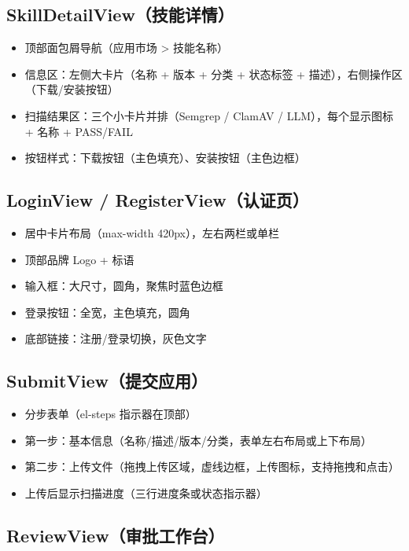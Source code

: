 \documentclass[11pt,a4paper]{article}
\begin{document}
\subsection{SkillDetailView（技能详情）}

\begin{itemize}[nosep]
  \item 顶部面包屑导航（应用市场 > 技能名称）
  \item 信息区：左侧大卡片（名称 + 版本 + 分类 + 状态标签 + 描述），右侧操作区（下载/安装按钮）
  \item 扫描结果区：三个小卡片并排（Semgrep / ClamAV / LLM），每个显示图标 + 名称 + PASS/FAIL
  \item 按钮样式：下载按钮（主色填充）、安装按钮（主色边框）
\end{itemize}

\subsection{LoginView / RegisterView（认证页）}

\begin{itemize}[nosep]
  \item 居中卡片布局（max-width 420px），左右两栏或单栏
  \item 顶部品牌 Logo + 标语
  \item 输入框：大尺寸，圆角，聚焦时蓝色边框
  \item 登录按钮：全宽，主色填充，圆角
  \item 底部链接：注册/登录切换，灰色文字
\end{itemize}

\subsection{SubmitView（提交应用）}

\begin{itemize}[nosep]
  \item 分步表单（el-steps 指示器在顶部）
  \item 第一步：基本信息（名称/描述/版本/分类，表单左右布局或上下布局）
  \item 第二步：上传文件（拖拽上传区域，虚线边框，上传图标，支持拖拽和点击）
  \item 上传后显示扫描进度（三行进度条或状态指示器）
\end{itemize}

\subsection{ReviewView（审批工作台）}
\end{document}
